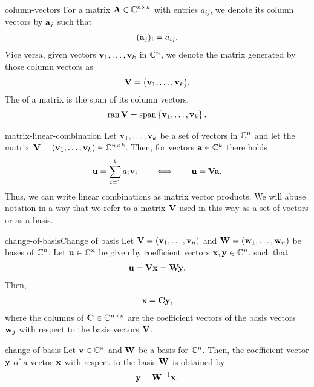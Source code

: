 \begin{Notation}{column-vectors}
  For a matrix $\mathbf A\in \mathbb C^{n\times k}$ with entries $a_{ij}$, we denote its column vectors by $\mathbf a_j$ such that
  \begin{gather}
      (\mathbf a_j)_i = a_{ij}.
  \end{gather}
  Vice versa, given vectors $\mathbf v_1,\dots,\mathbf v_k$ in $\mathbb C^n$, we denote the matrix generated by those column vectors as
  \begin{gather}
    \mathbf V = \bigl( \mathbf v_1,\dots,\mathbf v_k\bigr).
  \end{gather}
  The  of a matrix is the span of its column vectors,
  \begin{gather}
    \operatorname{ran}\mathbf V = \operatorname{span}\left\{\mathbf v_1,\dots,\mathbf v_k\right\}.
  \end{gather}
\end{Notation}

\begin{Notation}{matrix-linear-combination}
  Let $\mathbf v_1,\dots,\mathbf v_k$ be a set of vectors in $\mathbb C^n$ and let the matrix $\mathbf V=(\mathbf v_1,\dots,\mathbf v_k) \in \mathbb C^{n\times k}$. Then, for vectors $\mathbf a\in\mathbb C^k$ there holds
  \begin{gather}
      \mathbf u = \sum_{i=1}^k a_i \mathbf v_i
      \qquad \Longleftrightarrow \qquad
      \mathbf u = \mathbf V \mathbf a.
  \end{gather}
  Thus, we can write linear combinations as matrix vector products.
  We will abuse notation in a way that we refer to a matrix $\mathbf V$
  used in this way as a set of vectors or as a basis.
\end{Notation}

\begin{Lemma*}{change-of-basis}{Change of basis}
  Let $\mathbf V = (\mathbf v_1,\dots, \mathbf v_n)$ and $\mathbf W = (\mathbf w_1,\dots, \mathbf w_n)$ be
  bases of $\mathbb C^n$. Let $\mathbf u\in \mathbb C^n$ be given by coefficient vectors
  $\mathbf x,\mathbf y\in \mathbb C^n$, such that
  \begin{gather}
    \mathbf u = \mathbf V\mathbf x = \mathbf W\mathbf y.
  \end{gather}
  Then,
  \begin{gather}
    \mathbf x = \mathbf C \mathbf y,
  \end{gather}
  where the columns of $\mathbf C\in \mathbb C^{n\times n}$ are the coefficient
  vectors of the basis vectors $\mathbf w_j$ with respect to the basis
  vectors $\mathbf V$.
\end{Lemma*}

\begin{Corollary}{change-of-basis}
  Let $\mathbf v\in \mathbb C^n$ and $\mathbf W$ be a basis for $\mathbb C^n$. Then, the
  coefficient vector $\mathbf y$ of a vector $\mathbf x$ with respect to the
  basis $\mathbf W$ is obtained by
  \begin{gather}
    \mathbf y = \mathbf W^{-1} \mathbf x.
  \end{gather}
\end{Corollary}

